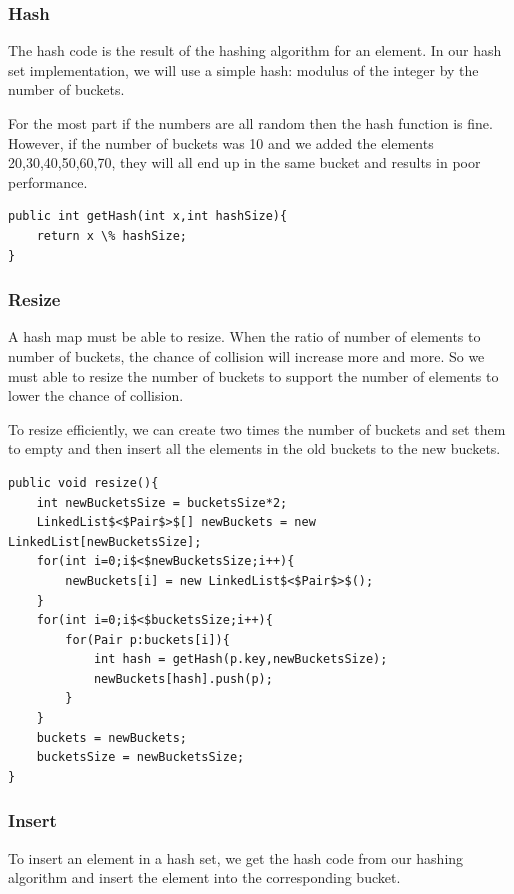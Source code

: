 \documentclass[11pt,oneside]{book}
\begin{document}
\subsubsection{Hash}

The hash code is the result of the hashing algorithm for an element. In our hash set implementation, we will use a simple hash: modulus of the integer by the number of buckets.

For the most part if the numbers are all random then the hash function is fine. However, if the number of buckets was 10 and we added the elements 20,30,40,50,60,70, they will all end up in the same bucket and results in poor performance.

\begin{lstlisting}
public int getHash(int x,int hashSize){
    return x \% hashSize;
}
\end{lstlisting}

\subsubsection{Resize}

A hash map must be able to resize. When the ratio of number of elements to number of buckets, the chance of collision will increase more and more. So we must able to resize the number of buckets to support the number of elements to lower the chance of collision.

To resize efficiently, we can create two times the number of buckets and set them to empty and then insert all the elements in the old buckets to the new buckets.

\begin{lstlisting}
public void resize(){
    int newBucketsSize = bucketsSize*2;
    LinkedList$<$Pair$>$[] newBuckets = new LinkedList[newBucketsSize];
    for(int i=0;i$<$newBucketsSize;i++){
        newBuckets[i] = new LinkedList$<$Pair$>$();
    }
    for(int i=0;i$<$bucketsSize;i++){
        for(Pair p:buckets[i]){
            int hash = getHash(p.key,newBucketsSize);
            newBuckets[hash].push(p);
        }
    }
    buckets = newBuckets;
    bucketsSize = newBucketsSize;
}
\end{lstlisting}

\subsubsection{Insert}

To insert an element in a hash set, we get the hash code from our hashing algorithm and insert the element into the corresponding bucket.
\end{document}
